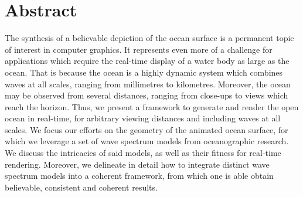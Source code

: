 \chapter*{Abstract}


The synthesis of a believable depiction of the ocean surface is a permanent
topic of interest in computer graphics. It represents even more of a
challenge for applications which require the real-time display of a water
body as large as the ocean.
That is because the ocean is a highly dynamic system which combines waves
at all scales, ranging from millimetres to kilometres. Moreover, the
ocean may be observed from several distances, ranging from close-ups
to views which reach the horizon. 
Thus, we present a framework to generate and render the open ocean in
real-time, for arbitrary viewing distances and including waves at all
scales. We focus our efforts on the geometry of the animated
ocean surface, for which we leverage a set of wave spectrum models from
oceanographic research. We discuss the intricacies of
said models, as well as their fitness for real-time rendering. Moreover,
we delineate in detail how to integrate distinct wave spectrum models into a
coherent framework, from which one is able obtain believable, consistent
and coherent results.


